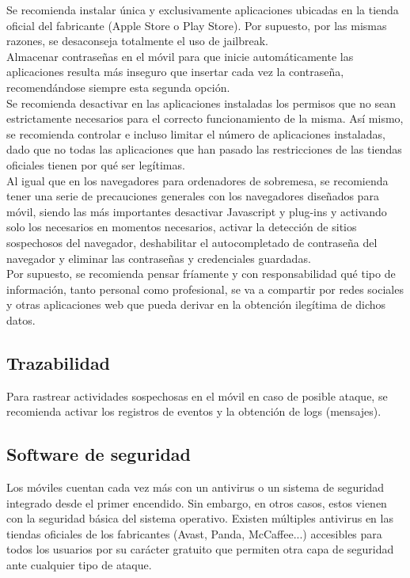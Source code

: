 \documentclass[11pt]{article}
\begin{document}
{Se recomienda instalar única y exclusivamente aplicaciones ubicadas en la tienda oficial del fabricante (Apple Store o Play Store). Por supuesto, por las mismas razones, se desaconseja totalmente el uso de jailbreak.} \\

{Almacenar contraseñas en el móvil para que inicie automáticamente las aplicaciones resulta más inseguro que insertar cada vez la contraseña, recomendándose siempre esta segunda opción.} \\

{Se recomienda desactivar en las aplicaciones instaladas los permisos que no sean estrictamente necesarios para el correcto funcionamiento de la misma. Así mismo, se recomienda controlar e incluso limitar el número de aplicaciones instaladas, dado que no todas las aplicaciones que han pasado las restricciones de las tiendas oficiales tienen por qué ser legítimas.} \\

{Al igual que en los navegadores para ordenadores de sobremesa, se recomienda tener una serie de precauciones generales con los navegadores diseñados para móvil, siendo las más importantes desactivar Javascript y plug-ins y activando solo los necesarios en momentos necesarios, activar la detección de sitios sospechosos del navegador, deshabilitar el autocompletado de contraseña del navegador y eliminar las contraseñas y credenciales guardadas.} \\

{Por supuesto, se recomienda pensar fríamente y con responsabilidad qué tipo de información, tanto personal como profesional, se va a compartir por redes sociales y otras aplicaciones web que pueda derivar en la obtención ilegítima de dichos datos.}

\subsection{Trazabilidad}

{Para rastrear actividades sospechosas en el móvil en caso de posible ataque, se recomienda activar los registros de eventos y la obtención de logs (mensajes).}

\subsection{Software de seguridad}

{Los móviles cuentan cada vez más con un antivirus o un sistema de seguridad integrado desde el primer encendido. Sin embargo, en otros casos, estos vienen con la seguridad básica del sistema operativo. Existen múltiples antivirus en las tiendas oficiales de los fabricantes (Avast, Panda, McCaffee...) accesibles para todos los usuarios por su carácter gratuito que permiten otra capa de seguridad ante cualquier tipo de ataque.}
\end{document}
